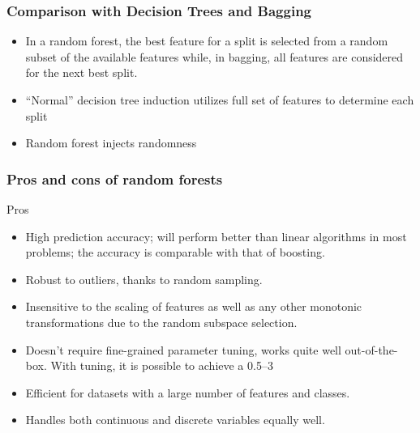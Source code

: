 




\begin{frame}[fragile]\frametitle{Comparison with Decision Trees and Bagging}
\begin{itemize}
\item In a random forest, the best feature for a split is selected from a random subset of the available features while, in bagging, all features are considered for the next best split.
\item ``Normal'' decision tree induction utilizes full set of features to determine each split
\item Random forest injects randomness
\end{itemize}
\end{frame}



\begin{frame}[fragile]\frametitle{Pros and cons of random forests}
Pros
\begin{itemize}
\item High prediction accuracy; will perform better than linear algorithms in most problems; the accuracy is comparable with that of boosting.
\item Robust to outliers, thanks to random sampling.
\item Insensitive to the scaling of features as well as any other monotonic transformations due to the random subspace selection.
\item Doesn't require fine-grained parameter tuning, works quite well out-of-the-box. With tuning, it is possible to achieve a 0.5–3%
\item Efficient for datasets with a large number of features and classes.
\item Handles both continuous and discrete variables equally well.
\end{itemize}
\end{frame}

